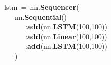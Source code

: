 \noindent
\mbox{}lstm\ =\ nn.\textbf{Sequencer}( \\
\mbox{}\ \ \ nn.\textbf{Sequential}() \\
\mbox{}\ \ \ \ \ \ :\textbf{add}(nn.\textbf{LSTM}(100,100)) \\
\mbox{}\ \ \ \ \ \ :\textbf{add}(nn.\textbf{Linear}(100,100)) \\
\mbox{}\ \ \ \ \ \ :\textbf{add}(nn.\textbf{LSTM}(100,100)) \\
\mbox{}\ \ \ )
